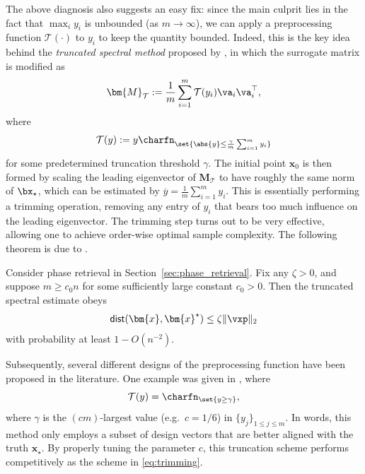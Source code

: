 The above diagnosis also suggests an easy fix: since the main culprit lies in the fact that $\max_i y_i$ is unbounded (as $m \to \infty$), we can apply a preprocessing function $\mathcal{T}(\cdot)$ to $y_i$ to keep the quantity bounded. Indeed, this is the key idea behind the {\em truncated spectral method} proposed by \cite{chen2015solving}, in which the surrogate matrix is modified as
%
\begin{equation}
	\label{eq:D_PR_T}
	\bm{M}_{\mathcal{T}} := \frac{1}{m} \sum_{i=1}^m \mathcal{T}(y_i) \va_i \va_i^\top,
\end{equation} 
%
where 
\begin{equation}\label{eq:trimming}
\mathcal{T}(y) := y \charfn_{\set{\abs{y} \le  \frac{\gamma}{m} \sum_{i=1}^m y_i}}
\end{equation}
for some predetermined truncation threshold $\gamma$. The initial point $\bm{x}_0$ is then formed by scaling the leading eigenvector of $\bm{M}_{\mathcal{T}}$ to have roughly the same norm of $\bx_{\star}$, which can be estimated by $\overline{y} =\frac{1}{m} \sum_{i=1}^m y_i $. This is essentially performing a trimming operation, removing any entry of $y_i$ that bears too much influence on the leading eigenvector.  The trimming step turns out to be very effective, allowing one to achieve order-wise optimal sample complexity. The following theorem is due to \cite{chen2015solving}. 
%
%


%
\begin{theorem}
	\label{thm:truncated-PR}
	Consider phase retrieval in Section~\ref{sec:phase_retrieval}. Fix any $\zeta > 0$, and suppose $m \ge c_0 n $ for some sufficiently large constant $c_0>0$.  Then the truncated spectral estimate obeys
\[
	\mathsf{dist}(\bm{x},\bm{x}^{\star})  \le \zeta \| \vxp \|_2
\]
with probability at least $1 - O(n^{-2})$.
\end{theorem}

Subsequently, several different designs of the preprocessing function have been proposed in the literature. One example was given in \cite{wang2017solving}, where
\begin{equation}\label{eq:subset}
	\mathcal{T}(y)  = \charfn_{\set{y \ge \gamma  }},
\end{equation}
%
where $\gamma$ is the $(cm)$-largest value (e.g.~$c=1/6$) in $\{ y_j \}_{1\le j\le m}$. In words, this method only employs a subset of design vectors that are better aligned with the truth $\bm{x}_{\star}$.  By properly tuning the parameter $c$, this truncation scheme performs competitively as the scheme in \eqref{eq:trimming}.

